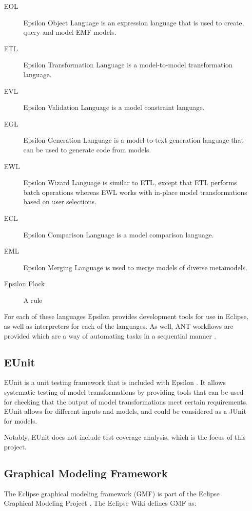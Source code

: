 \begin{description}
\item[EOL] Epsilon Object Language is an expression language that is used to create, query and model EMF models.
\item[ETL] Epsilon Transformation Language is a model-to-model transformation language.
\item[EVL] Epsilon Validation Language is a model constraint language.
\item[EGL] Epsilon Generation Language is a model-to-text generation language that can be used to generate code from models.
\item[EWL] Epsilon Wizard Language is similar to ETL, except that ETL performs batch operations whereas EWL works with in-place model transformations based on user selections.
\item[ECL] Epsilon Comparison Language is a model comparison language.
\item[EML] Epsilon Merging Language is used to merge models of diverse metamodels.
\item[Epsilon Flock] A rule
\end{description}

For each of these languages Epsilon provides development tools for use in Eclipse, as well as interpreters for each of the languages. As well, ANT workflows are provided which are a way of automating tasks in a sequential manner \citep{epsilonBook}.

\subsection{EUnit}
EUnit is a unit testing framework that is included with Epsilon \citep{epsilonWebsite}. It allows systematic testing of model transformations by providing tools that can be used for checking that the output of model transformations meet certain requirements. \citep{epsilonBook} EUnit allows for different inputs and models, and could be considered as a JUnit for models.

Notably, EUnit does not include test coverage analysis, which is the focus of this project.

\subsection{Graphical Modeling Framework}

The Eclipse graphical modeling framework (GMF) is part of the Eclipse Graphical Modeling Project \citep{gmpSite}. The Eclipse Wiki \cite{gmpFAQ} defines GMF as:

